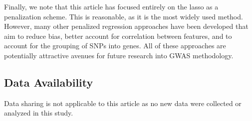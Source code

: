 Finally, we note that this article has focused entirely on the lasso as a penalization scheme. This is reasonable, as it is the most widely used method. However, many other penalized regression approaches have been developed that aim to reduce bias, better account for correlation between features, and to account for the grouping of SNPs into genes. All of these approaches are potentially attractive avenues for future research into GWAS methodology.

\subsection*{Data Availability}

Data sharing is not applicable to this article as no new data were collected or analyzed in this study.
